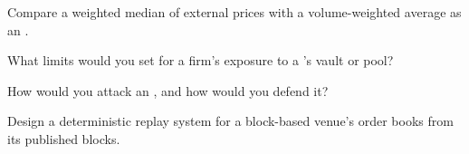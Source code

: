 \begin{interviewq}\label{iq:m3:on-chain-order-books-and-perpetual-dexs:3}
Compare a weighted median of external prices with a volume-weighted average as an .
\end{interviewq}

\begin{interviewq}\label{iq:m3:on-chain-order-books-and-perpetual-dexs:4}
What limits would you set for a firm's exposure to a 's vault or pool?
\end{interviewq}

\begin{interviewq}\label{iq:m3:on-chain-order-books-and-perpetual-dexs:5}
How would you attack an , and how would you defend it?
\end{interviewq}

\begin{interviewq}\label{iq:m3:on-chain-order-books-and-perpetual-dexs:6}
Design a deterministic replay system for a block-based venue's order books from its published blocks.
\end{interviewq}
